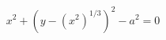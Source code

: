 \documentclass[preview]{standalone}
\begin{document}
\begin{align*}
x^2 + \left(y - (x^2)^{1/3} \right)^2 - a^2 = 0
\end{align*}
\end{document}

